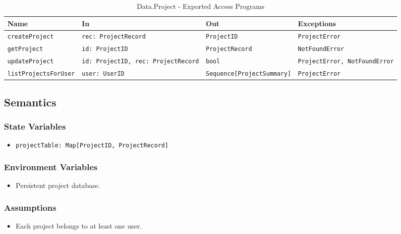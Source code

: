 \documentclass[12pt, titlepage]{article}
\begin{document}
\begin{table}[H]
\centering
\small
\caption{Data.Project - Exported Access Programs}
\begin{tabular}{p{3.8cm} p{3.2cm} p{4.5cm} p{2.5cm}}
\toprule
\textbf{Name} & \textbf{In} & \textbf{Out} & \textbf{Exceptions} \\
\midrule
\texttt{createProject} & \texttt{rec: ProjectRecord} & \texttt{ProjectID} & \texttt{ProjectError} \\
\texttt{getProject} & \texttt{id: ProjectID} & \texttt{ProjectRecord} & \texttt{NotFoundError} \\
\texttt{updateProject} & \texttt{id: ProjectID, rec: ProjectRecord} & \texttt{bool} & \texttt{ProjectError, NotFoundError} \\
\texttt{listProjectsForUser} & \texttt{user: UserID} & \texttt{Sequence[ProjectSummary]} & \texttt{ProjectError} \\
\bottomrule
\end{tabular}
\end{table}

\subsection{Semantics}

\subsubsection{State Variables}
\begin{itemize}
    \item \texttt{projectTable: Map[ProjectID, ProjectRecord]}
\end{itemize}

\subsubsection{Environment Variables}
\begin{itemize}
    \item Persistent project database.
\end{itemize}

\subsubsection{Assumptions}
\begin{itemize}
    \item Each project belongs to at least one user.
\end{itemize}
\end{document}
